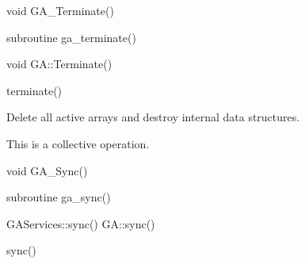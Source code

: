 \documentclass[12pt]{article}
\begin{document}

\begin{capi}
\begin{ccode}
void GA_Terminate()
\end{ccode}
\end{capi}

\begin{fapi}
\begin{fcode}
subroutine ga_terminate()
\end{fcode}
\end{fapi}

\begin{cxxapi}
\begin{cxxcode}
void GA::Terminate()
\end{cxxcode}
\end{cxxapi}

\begin{pyapi}
\begin{pycode}
terminate()
\end{pycode}
\end{pyapi}
\wcoll

\begin{desc}

Delete all active arrays and destroy internal data structures.

This is a collective operation.

\end{desc}


\begin{capi}
\begin{ccode}
void GA_Sync()
\end{ccode}
\end{capi}

\begin{fapi}
\begin{fcode}
subroutine ga_sync()
\end{fcode}
\end{fapi}

\begin{cxxapi}
\begin{cxxcode}
GAServices::sync()
GA::sync()
\end{cxxcode}
\end{cxxapi}

\begin{pyapi}
\begin{pycode}
sync()
\end{pycode}
\end{pyapi}
\dcoll
\end{document}
